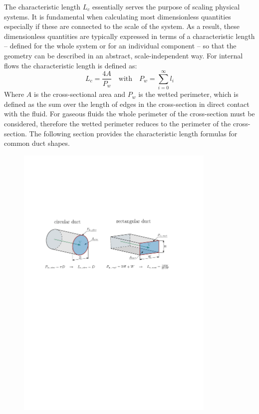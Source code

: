 The characteristic length $L_c$ essentially serves the purpose of scaling physical systems.
It is fundamental when calculating most dimensionless quantities especially if these are connected to the scale of the system.
As a result, these dimensionless quantities are typically expressed in terms of a characteristic length -- defined for the whole system or for an individual component -- so that the geometry can be described in an abstract, scale-independent way.
For internal flows the characteristic length is defined as:
\begin{equation}
	L_c=\frac{4A}{P_w} \quad \text{with} \quad P_w = \sum^{\infty}_{i=0} l_i
\end{equation}
Where $A$ is the cross-sectional area and $P_w$ is the wetted perimeter, which is defined as the sum over the length of edges in the cross-section in direct contact with the fluid.
For gaseous fluids the whole perimeter of the cross-section must be considered, therefore the wetted perimeter reduces to the perimeter of the cross-section.
The following section provides the characteristic length formulas for common duct shapes.
\cite{leishman_internal_2023}
\begin{figure}[H]
    \centering
    \includegraphics[width=0.85\textwidth]{src/02_foundations/fig_wetted-perimeter-nozzle-rect.pdf}
    \label{fig:wetted-rect-nozzle}
\end{figure}
